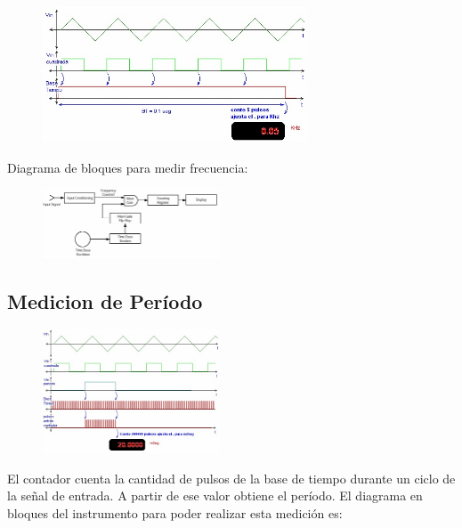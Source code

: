 \documentclass{article}
\begin{document}
\begin{figure}[h]
	\centering
	\includegraphics[width=0.70\textwidth]{images/ondasFrecuenciaContador.jpg}
	\medskip
\end{figure}
\bigskip\bigskip

	
	\medskip
	Diagrama de bloques para medir frecuencia:
	
	\begin{figure}[h]
				\centering
				\includegraphics[width=0.47\textwidth]{images/diagramaBloquesFrecuenciaContador.jpg}
				\medskip
	\end{figure}
	\bigskip\bigskip
	
\subsection {Medicion de Período}
		
	\begin{figure}[h]
		\centering
		\includegraphics[width=0.47\textwidth]{images/ondasPeriodoContador.jpg}
		\medskip
	\end{figure}
	\bigskip\bigskip
	
	El contador cuenta la cantidad de pulsos de la base de tiempo durante un ciclo de la señal de entrada. A partir de ese valor obtiene el período.
	\medskip
	El diagrama en bloques del instrumento para poder realizar esta medición es:
		
\end{document}
